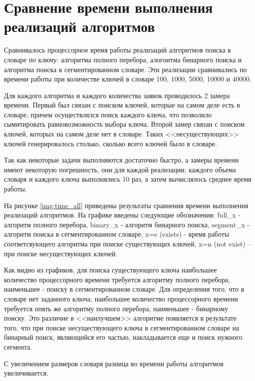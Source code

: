\section{Сравнение времени выполнения реализаций алгоритмов}

Сравнивалось процессорное время работы реализаций алгоритмов поиска в словаре по ключу: алгоритма полного перебора, алогоитма бинарного поиска и алгоритма поиска в сегментированном словаре. Эти реализации сравнивались по времени работы при количестве ключей в словаре 100, 1000, 5000, 10000 и 40000.

Для каждого алгоритма и каждого количества заявок проводилось 2 замера времени. Первый был связан с поиском ключей, которые на самом деле есть в словаре, причем осуществлялся поиск каждого ключа, что позволило сымитировать равновозможность выбора ключа. Второй замер связан с поиском ключей, которых на самом деле нет в словаре. Таких <<несуществующих>> ключей генерировалось столько, сколько всего ключей было в словаре.
 
Так как некоторые задачи выполняются достаточно быстро, а замеры времени имеют некоторую погрешность, они для каждой реализации, каждого объема словаря и каждого ключа выполнялись 10 раз, а затем вычислялось среднее время работы.
 

На рисунке \ref{img:time_all} приведены результаты сравнения времени выполнения реализаций алгоритмов. На графике введены следующие обозначения: full\_x - алгоритм полного перебора, binary\_x - алгоритм бинарного поиска, segment\_x - алгоритм поиска в сегментированном словаре, x=e (exists) - время работы соответсвующего алгоритма при поиске существующих ключей, x=n (not exist) -- при поиске несуществующих ключей.

\clearpage
{}

Как видно из графиков, для поиска существующего ключа наибольшее количество процессорного времени требуется алгоритму полного перебора, наименьшее - поиску в сегментированном словаре. Для определения того, что в словаре нет заданного ключа, наибольшее количество процессорного времени требуется опять же алгоритму полного перебора, наименьшее - бинарному поиску. Это различие в <<наилучшем>> алгоритме появляется в результате того, что при поиске несуществующего ключа в сегментированном словаре на бинарный поиск, являющийся его частью, накладывается еще и поиск нужного сегмента.

С увеличением размеров словаря разница во времени работы алгоритмов увеличивается.

